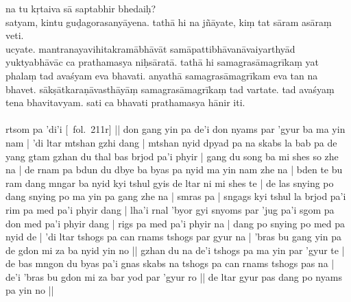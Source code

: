 \documentclass[12pt]{article}
\begin{document}
na tu\footnoteB{
	na tu] \conj ; nanu \MS\ \EDD
} kṛtaiva sā saptabhir bhedaiḥ?\\

satyam, kintu guḍagorasanyāyena. tathā hi na jñāyate, kiṃ tat sāram asāraṃ veti.\\

ucyate. mantranayavihitakramābhāvāt samāpattibhāvanāvaiyarthyād\footnoteB{
	samāpatti°] \MS\ \EDD\ \TVB\ (snyom par 'jug pa); lha'i rnal 'byor gyi snyoms par 'jug pa'i \TVA\ (devatāyogasamāpatti°)
} yuktyabhāvāc\footnoteB{
	yuktyabhāvāc] \EDD ; yuktābhāvāc \MS
} ca prathamasya niḥsāratā. tathā hi samagrasāmagrīkaṃ yat phalaṃ\footnoteB{
	yat phalaṃ] \conj\ (\TIB : 'bras bu gang yin pa); yat \MS \EDD
} tad avaśyam eva bhavati. anyathā samagrasāmagrīkam eva tan na bhavet. sākṣātkaraṇāvasthāyāṃ samagrasāmagrīkaṃ tad vartate. tad avaśyaṃ tena bhavitavyam. sati ca bhavati prathamasya hānir iti.\\

\textbf{\TVA}\\
rtsom pa 'di'i [\TVA\ fol.\ 211r] || don gang yin pa de'i don nyams par 'gyur ba ma yin nam | 'di ltar mtshan gzhi dang | mtshan nyid dpyad pa na skabs la bab pa de yang gtam gzhan du thal bas brjod pa'i phyir | gang du song ba mi shes so zhe na | de rnam pa bdun du dbye ba byas pa nyid ma yin nam zhe na | bden te bu ram dang mngar ba nyid kyi tshul gyis de ltar ni mi shes te | de las snying po dang snying po ma yin pa gang zhe na | smras pa | sngags kyi tshul la brjod pa'i rim pa med pa'i phyir dang | lha'i rnal 'byor gyi snyoms par 'jug pa'i sgom pa don med pa'i phyir dang | rigs pa med pa'i phyir na | dang po snying po med pa nyid de | 'di ltar tshogs pa can rnams tshogs par gyur na | 'bras bu gang yin pa de gdon mi za ba nyid yin no || gzhan du na de'i tshogs pa ma yin par 'gyur te | de bas mngon du byas pa'i gnas skabs na tshogs pa can rnams tshogs pas na | de'i 'bras bu gdon mi za bar yod par 'gyur ro || de ltar gyur pas dang po nyams pa yin no || \\
\end{document}
